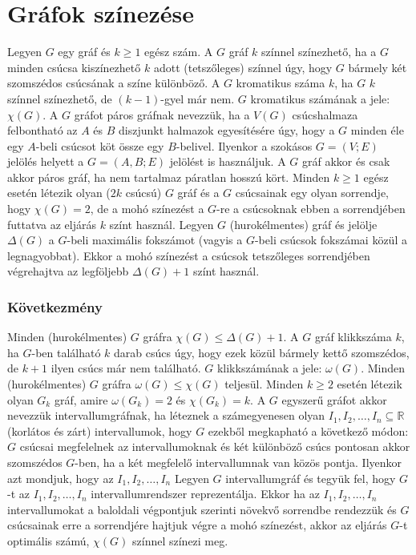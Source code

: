 \documentclass[12pt,a4paper,twoside]{report}
\begin{document}
\section{Gráfok színezése}
\df
Legyen $G$ egy gráf és $k\geq1$ egész szám. A $G$ gráf $k$ színnel színezhető, ha a $G$ minden csúcsa kiszínezhető $k$ adott (tetszőleges) színnel úgy, hogy $G$ bármely két szomszédos csúcsának a színe különböző. A $G$ kromatikus száma $k$, ha
$G$ $k$ színnel színezhető, de $(k - 1)$-gyel már nem. $G$ kromatikus számának a jele:
$\chi(G)$.
\df
A $G$ gráfot páros gráfnak nevezzük, ha a $V(G)$ csúcshalmaza felbontható az $A$ és $B$ diszjunkt halmazok egyesítésére úgy, hogy a $G$ minden éle egy
$A$-beli csúcsot köt össze egy $B$-belivel. Ilyenkor a szokásos $G = (V ; E)$ jelölés helyett a $G = (A, B; E)$ jelölést is használjuk.
\ttl
A $G$ gráf akkor és csak akkor páros gráf, ha nem tartalmaz páratlan
hosszú kört.
\al
Minden $k \geq 1$ egész esetén létezik olyan ($2k$ csúcsú) $G$ gráf és a $G$ csúcsainak egy olyan sorrendje, hogy $\chi(G) = 2$, de a mohó színezést a $G$-re a
csúcsoknak ebben a sorrendjében futtatva az eljárás $k$ színt használ.
\al
 Legyen $G$ (hurokélmentes) gráf és jelölje $\Delta(G)$ a $G$-beli maximális
fokszámot (vagyis a $G$-beli csúcsok fokszámai közül a legnagyobbat). Ekkor a mohó színezést a csúcsok tetszőleges sorrendjében végrehajtva az legföljebb $\Delta(G) + 1$
színt használ.
\subsubsection{Következmény}
 Minden (hurokélmentes) $G$ gráfra $\chi(G)\leq\Delta(G) + 1$.
\df
A $G$ gráf klikkszáma $k$, ha $G$-ben található $k$ darab csúcs úgy, hogy ezek közül bármely kettő szomszédos, de $k + 1$ ilyen csúcs már nem található.
$G$ klikkszámának a jele: $\omega(G)$.
\al 
Minden (hurokélmentes) $G$ gráfra $\omega(G) \leq \chi(G)$ teljesül.
\ttl
Minden $k\geq2$ esetén létezik olyan $G_k$ gráf, amire $\omega(G_k ) = 2$ és
$\chi(G_k ) = k$.
\df
A $G$ egyszerű gráfot akkor nevezzük intervallumgráfnak, ha léteznek a számegyenesen olyan $I_1 , I_2 ,\dots, I_n \subseteq \mathbb{R}$ (korlátos és zárt) intervallumok, hogy $G$ ezekből megkapható a következő módon: $G$ csúcsai megfelelnek az intervallumoknak és két különböző csúcs pontosan akkor szomszédos $G$-ben, ha a két megfelelő intervallumnak van közös pontja. Ilyenkor azt mondjuk, hogy az ${I_1,I_2 ,\dots, I_n }$
\ttl
 Legyen $G$ intervallumgráf és tegyük fel, hogy $G$-t az ${I_1 , I_2 ,\dots, I_n }$
intervallumrendszer reprezentálja. Ekkor ha az ${I_1 ,I_2,\dots, I_n }$ intervallumokat a baloldali végpontjuk szerinti növekvő sorrendbe rendezzük és $G$ csúcsainak erre a
sorrendjére hajtjuk végre a mohó színezést, akkor az eljárás $G$-t optimális számú,
$\chi(G)$ színnel színezi meg.
\end{document}
